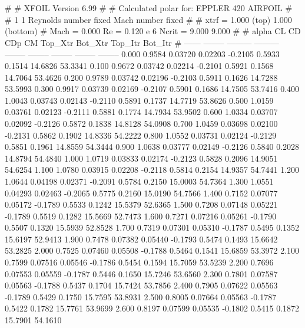#  
#       XFOIL         Version 6.99
#  
# Calculated polar for: EPPLER 420 AIRFOIL                              
#  
# 1 1 Reynolds number fixed          Mach number fixed         
#  
# xtrf =   1.000 (top)        1.000 (bottom)  
# Mach =   0.000     Re =     0.120 e 6     Ncrit =   9.000  9.000
#  
#   alpha    CL        CD       CDp       CM     Top_Xtr  Bot_Xtr  Top_Itr  Bot_Itr
#  ------ -------- --------- --------- -------- -------- -------- -------- --------
   0.000   0.9584   0.03720   0.02203  -0.2105   0.5933   0.1514  14.6826  53.3341
   0.100   0.9672   0.03742   0.02214  -0.2101   0.5921   0.1568  14.7064  53.4626
   0.200   0.9789   0.03742   0.02196  -0.2103   0.5911   0.1626  14.7288  53.5993
   0.300   0.9917   0.03739   0.02169  -0.2107   0.5901   0.1686  14.7505  53.7416
   0.400   1.0043   0.03743   0.02143  -0.2110   0.5891   0.1737  14.7719  53.8626
   0.500   1.0159   0.03761   0.02123  -0.2111   0.5881   0.1774  14.7934  53.9502
   0.600   1.0334   0.03707   0.02092  -0.2126   0.5872   0.1838  14.8128  54.0908
   0.700   1.0459   0.03698   0.02100  -0.2131   0.5862   0.1902  14.8336  54.2222
   0.800   1.0552   0.03731   0.02124  -0.2129   0.5851   0.1961  14.8559  54.3444
   0.900   1.0638   0.03777   0.02149  -0.2126   0.5840   0.2028  14.8794  54.4840
   1.000   1.0719   0.03833   0.02174  -0.2123   0.5828   0.2096  14.9051  54.6254
   1.100   1.0780   0.03915   0.02208  -0.2118   0.5814   0.2154  14.9357  54.7441
   1.200   1.0644   0.04198   0.02371  -0.2091   0.5784   0.2150  15.0003  54.7364
   1.300   1.0551   0.04293   0.02463  -0.2065   0.5775   0.2160  15.0190  54.7566
   1.400   0.7152   0.07077   0.05172  -0.1789   0.5533   0.1242  15.5379  52.6365
   1.500   0.7208   0.07148   0.05221  -0.1789   0.5519   0.1282  15.5669  52.7473
   1.600   0.7271   0.07216   0.05261  -0.1790   0.5507   0.1320  15.5939  52.8528
   1.700   0.7319   0.07301   0.05310  -0.1787   0.5495   0.1352  15.6197  52.9413
   1.900   0.7478   0.07382   0.05440  -0.1793   0.5474   0.1493  15.6642  53.2825
   2.000   0.7525   0.07460   0.05508  -0.1788   0.5464   0.1541  15.6859  53.3972
   2.100   0.7599   0.07516   0.05546  -0.1786   0.5454   0.1594  15.7059  53.5239
   2.200   0.7696   0.07553   0.05559  -0.1787   0.5446   0.1650  15.7246  53.6560
   2.300   0.7801   0.07587   0.05563  -0.1788   0.5437   0.1704  15.7424  53.7856
   2.400   0.7905   0.07622   0.05563  -0.1789   0.5429   0.1750  15.7595  53.8931
   2.500   0.8005   0.07664   0.05563  -0.1787   0.5422   0.1782  15.7761  53.9699
   2.600   0.8197   0.07599   0.05535  -0.1802   0.5415   0.1872  15.7901  54.1610
